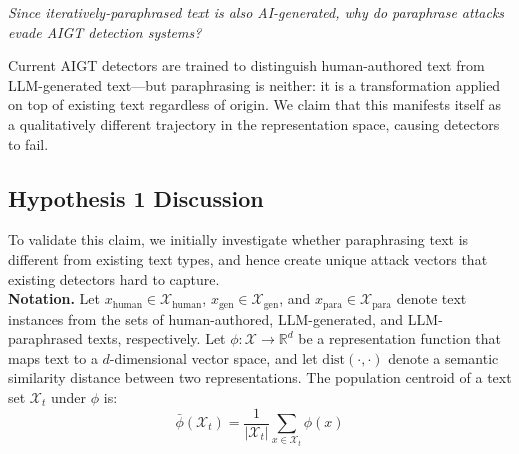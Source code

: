 \documentclass[runningheads]{llncs}
\begin{document}
\textit{Since iteratively-paraphrased text is also AI-generated, why do
paraphrase attacks evade AIGT detection systems?}

\noindent Current AIGT detectors are
trained to distinguish human-authored text from LLM-generated text---but paraphrasing is neither: it is a transformation applied on top of existing text regardless of origin. 
We claim that this manifests itself as a qualitatively different trajectory in 
the representation space, causing detectors to fail.

\subsection{Hypothesis 1 Discussion}

To validate this claim, we initially investigate whether paraphrasing text is different from existing text types, and hence create unique attack vectors that existing detectors hard to capture.\\

\noindent\textbf{Notation.} Let $x_{\text{human}} \in 
\mathcal{X}_{\text{human}}$, $x_{\text{gen}} \in \mathcal{X}_{\text{gen}}$, 
and $x_{\text{para}} \in \mathcal{X}_{\text{para}}$ denote text instances
from the sets of human-authored, LLM-generated, and LLM-paraphrased
texts, respectively. Let $\phi: \mathcal{X} \rightarrow \mathbb{R}^{d}$
be a representation function that maps text to a $d$-dimensional vector
space, and let $\text{dist}(\cdot, \cdot)$ denote a semantic similarity
distance between two representations. The population centroid of a text
set $\mathcal{X}_t$ under $\phi$ is:
\begin{equation}
    \bar{\phi}(\mathcal{X}_t) = \frac{1}{|\mathcal{X}_t|}
    \sum_{x \in \mathcal{X}_t} \phi(x)
    \label{eq:centroid}
\end{equation}

\end{document}
